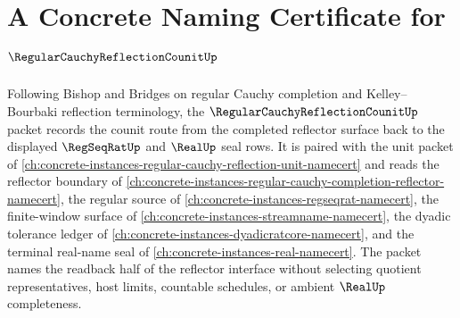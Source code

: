 \chapter{A Concrete Naming Certificate for $\RegularCauchyReflectionCounitUp$}
\label{ch:concrete-instances-regular-cauchy-reflection-counit-namecert}

Following Bishop and Bridges on regular Cauchy completion and Kelley--Bourbaki reflection terminology, the $\RegularCauchyReflectionCounitUp$ packet records the counit route from the completed reflector surface back to the displayed $\RegSeqRatUp$ and $\RealUp$ seal rows. It is paired with the unit packet of \autoref{ch:concrete-instances-regular-cauchy-reflection-unit-namecert} and reads the reflector boundary of \autoref{ch:concrete-instances-regular-cauchy-completion-reflector-namecert}, the regular source of \autoref{ch:concrete-instances-regseqrat-namecert}, the finite-window surface of \autoref{ch:concrete-instances-streamname-namecert}, the dyadic tolerance ledger of \autoref{ch:concrete-instances-dyadicratcore-namecert}, and the terminal real-name seal of \autoref{ch:concrete-instances-real-namecert}. The packet names the readback half of the reflector interface without selecting quotient representatives, host limits, countable schedules, or ambient $\RealUp$ completeness.

